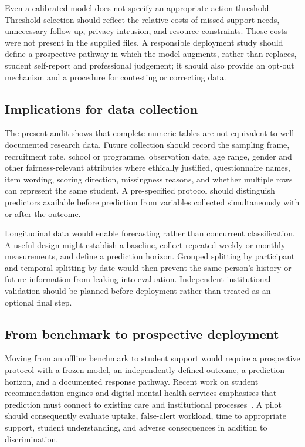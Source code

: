 \documentclass[review]{elsarticle}
\begin{document}
Even a calibrated model does not specify an appropriate action threshold. Threshold selection should reflect the relative costs of missed support needs, unnecessary follow-up, privacy intrusion, and resource constraints. Those costs were not present in the supplied files. A responsible deployment study should define a prospective pathway in which the model augments, rather than replaces, student self-report and professional judgement; it should also provide an opt-out mechanism and a procedure for contesting or correcting data.

\subsection{Implications for data collection}
The present audit shows that complete numeric tables are not equivalent to well-documented research data. Future collection should record the sampling frame, recruitment rate, school or programme, observation date, age range, gender and other fairness-relevant attributes where ethically justified, questionnaire names, item wording, scoring direction, missingness reasons, and whether multiple rows can represent the same student. A pre-specified protocol should distinguish predictors available before prediction from variables collected simultaneously with or after the outcome.

Longitudinal data would enable forecasting rather than concurrent classification. A useful design might establish a baseline, collect repeated weekly or monthly measurements, and define a prediction horizon. Grouped splitting by participant and temporal splitting by date would then prevent the same person's history or future information from leaking into evaluation. Independent institutional validation should be planned before deployment rather than treated as an optional final step.

\subsection{From benchmark to prospective deployment}
Moving from an offline benchmark to student support would require a prospective protocol with a frozen model, an independently defined outcome, a prediction horizon, and a documented response pathway. Recent work on student recommendation engines and digital mental-health services emphasises that prediction must connect to existing care and institutional processes~\cite{velmovitsky2025,pryss2025}. A pilot should consequently evaluate uptake, false-alert workload, time to appropriate support, student understanding, and adverse consequences in addition to discrimination.
\end{document}
